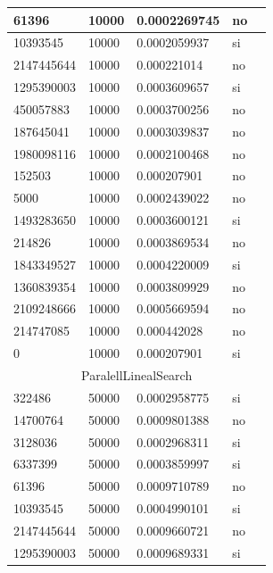 \documentclass[12pt, fleqn]{article}                             %
\theoremstyle{break}                                            %
\begin{document}
\begin{longtable}{|m{5em}|m{5em}|m{10em}|m{5em}|@{}m{0pt}@{}}
            61396& 10000  & 0.0002269745 & no &\\[1em]    \hline
            10393545& 10000  & 0.0002059937 & si &\\[1em]    \hline
            2147445644& 10000  & 0.000221014 & no &\\[1em]    \hline
            1295390003& 10000  & 0.0003609657 & si &\\[1em]    \hline
            450057883& 10000  & 0.0003700256 & no &\\[1em]    \hline
            187645041& 10000  & 0.0003039837 & no &\\[1em]    \hline
            1980098116& 10000  & 0.0002100468 & no &\\[1em]    \hline
            152503& 10000  & 0.000207901 & no &\\[1em]    \hline
            5000& 10000  & 0.0002439022 & no &\\[1em]    \hline
            1493283650& 10000  & 0.0003600121 & si &\\[1em]    \hline
            214826& 10000  & 0.0003869534 & no &\\[1em]    \hline
            1843349527& 10000  & 0.0004220009 & si &\\[1em]    \hline
            1360839354& 10000  & 0.0003809929 & no &\\[1em]    \hline
            2109248666& 10000  & 0.0005669594 & no &\\[1em]    \hline
            214747085& 10000  & 0.000442028 & no &\\[1em]    \hline
            0& 10000  & 0.000207901 & si &\\[1em]    \hline
            \multicolumn{5}{|c|}{ParalellLinealSearch}   \\          \hline
            322486& 50000  & 0.0002958775 & si &\\[1em]    \hline
            14700764& 50000  & 0.0009801388 & no &\\[1em]    \hline
            3128036& 50000  & 0.0002968311 & si &\\[1em]    \hline
            6337399& 50000  & 0.0003859997 & si &\\[1em]    \hline
            61396& 50000  & 0.0009710789 & no &\\[1em]    \hline
            10393545& 50000  & 0.0004990101 & si &\\[1em]    \hline
            2147445644& 50000  & 0.0009660721 & no &\\[1em]    \hline
            1295390003& 50000  & 0.0009689331 & si &\\[1em]    \hline

\end{longtable}
\end{document}
